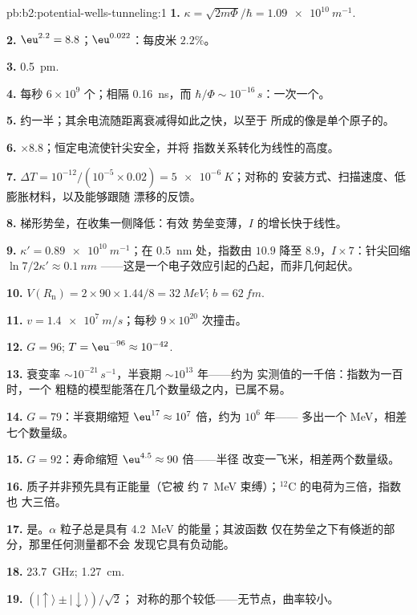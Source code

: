 \begin{solution}{pb:b2:potential-wells-tunneling:1}
\textbf{1.} $\kappa = \sqrt{2m\Phi}/\hbar = \qty{1.09e10}{m^{-1}}$.

\textbf{2.} $\eu^{2.2} = 8.8$；$\eu^{0.022}$：每皮米 $2.2\%$。

\textbf{3.} \qty{0.5}{pm}.

\textbf{4.} 每秒 $6 \times 10^9$ 个；相隔 \qty{0.16}{ns}，而 $\hbar/\Phi
\sim 10^{-16}\,\unit{s}$：一次一个。

\textbf{5.} 约一半；其余电流随距离衰减得如此之快，以至于
所成的像是单个原子的。

\textbf{6.} $\times 8.8$；恒定电流使针尖安全，并将
指数关系转化为线性的高度。

\textbf{7.} $\Delta T = 10^{-12}/(10^{-5} \times 0.02) = \qty{5e-6}{K}$；对称的
安装方式、扫描速度、低膨胀材料，以及能够跟随
漂移的反馈。

\textbf{8.} 梯形势垒，在收集一侧降低：有效
势垒变薄，$I$ 的增长快于线性。

\textbf{9.} $\kappa' = \qty{0.89e10}{m^{-1}}$；在 \qty{0.5}{nm} 处，指数由
$10.9$ 降至 $8.9$，$I \times 7$：针尖回缩 $\ln 7/2\kappa' \approx \qty{0.1}{nm}$
——这是一个电子效应引起的凸起，而非几何起伏。

\textbf{10.} $V(R_{\text{n}}) = 2 \times 90 \times 1.44/8 = \qty{32}{MeV}$; $b = \qty{62}{fm}$.

\textbf{11.} $v = \qty{1.4e7}{m/s}$；每秒 $9 \times 10^{20}$ 次撞击。

\textbf{12.} $G = 96$; $T = \eu^{-96} \approx 10^{-42}$.

\textbf{13.} 衰变率 $\sim 10^{-21}\,\unit{s^{-1}}$，半衰期 $\sim 10^{13}$ 年——约为
实测值的一千倍：指数为一百时，一个
粗糙的模型能落在几个数量级之内，已属不易。

\textbf{14.} $G = 79$：半衰期缩短 $\eu^{17} \approx 10^7$ 倍，约为 $10^6$ 年——
多出一个 MeV，相差七个数量级。

\textbf{15.} $G = 92$：寿命缩短 $\eu^{4.5} \approx 90$ 倍——半径
改变一飞米，相差两个数量级。

\textbf{16.} 质子并非预先具有正能量（它被
约 \qty{7}{MeV} 束缚）；$^{12}$C 的电荷为三倍，指数也
大三倍。

\textbf{17.} 是。$\alpha$ 粒子总是具有 \qty{4.2}{MeV} 的能量；其波函数
仅在势垒之下有倏逝的部分，那里任何测量都不会
发现它具有负动能。

\textbf{18.} \qty{23.7}{GHz}; \qty{1.27}{cm}.

\textbf{19.} $(|{\uparrow}\rangle \pm |{\downarrow}\rangle)/\sqrt2$；
对称的那个较低——无节点，曲率较小。


\end{solution}
